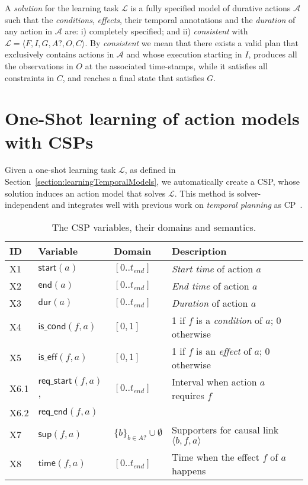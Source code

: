\documentclass{ecai}
\newcommand{\tup}[1]{{\langle #1 \rangle}}
\newcommand{\dur}{\mathsf{dur}}    %
\newcommand{\iscond}{\mathsf{is\_cond}}    %
\newcommand{\iseff}{\mathsf{is\_eff}}    %
\newcommand{\start}{\mathsf{start}}%
\newcommand{\en}{\mathsf{end}}     %
\newcommand{\supp}{\mathsf{sup}}   %
\newcommand{\tim}{\mathsf{time}}   %
\newcommand{\reqs}{\mathsf{req\_{start}}} %
\newcommand{\reqe}{\mathsf{req\_{end}}}   %
\begin{document}
A {\em solution} for the learning task $\mathcal{L}$ is a fully specified model of durative actions $\mathcal{A}$ such that the {\em conditions}, {\em effects}, their temporal annotations and the {\em duration} of any action in $\mathcal{A}$ are: i) completely specified; and ii) {\em consistent} with $\mathcal{L}=\tup{F,I,G,A?,O,C}$. By {\em consistent} we mean that there exists a valid plan that exclusively contains actions in $\mathcal{A}$ and whose execution starting in $I$, produces all the observations in $O$ at the associated time-stamps, while it satisfies all constraints in $C$, and reaches a final state that satisfies $G$.



\section{One-Shot learning of action models with CSPs}
\label{section:learningAsCSP}
Given a one-shot learning task $\mathcal{L}$, as defined in Section~\ref{section:learningTemporalModels}, we automatically create a CSP, whose solution induces an action model that solves $\mathcal{L}$. This method is solver-independent and integrates well with previous work on {\em temporal planning} as CP~\cite{garrido2009constraint,vidal2006branching}. 

\begin{table}
\begin{center}
\caption{The CSP variables, their domains and semantics.}
\begin{scriptsize}
\begin{tabular}{llll}
\hline	
{\bf ID} & {\bf Variable} & {\bf Domain} & {\bf Description} \\
\hline
X1 &$\start(a)$ & $[0..t_{end}]$ & {\em Start time} of action $a$ \\
X2 &$\en(a)$ & $[0..t_{end}]$ & {\em End time} of action $a$ \\
X3 &$\dur(a)$ & $[0..t_{end}]$ & {\em Duration} of action $a$ \\

X4 &$\iscond(f,a)$ & $[0,1]$ & 1 if $f$ is a {\em condition} of $a$; 0 otherwise \\
X5 &$\iseff(f,a)$ & $[0,1]$ & 1 if $f$ is an {\em effect} of $a$; 0 otherwise \\

X6.1 &$\reqs(f,a)$, & $[0..t_{end}]$ & Interval when action $a$ requires $f$\\ 
X6.2 &$\reqe(f,a)$  &  & \\

X7 &$\supp(f,a)$ & $\{b\}_{b\in A?} \cup \emptyset $&  Supporters for causal link $\tup{b,f,a}$ \\ 
X8 &$\tim(f,a)$ & $[0..t_{end}]$ & Time when the effect $f$ of $a$ happens\\

\end{tabular}
\end{scriptsize}
\label{table:variables}
\end{center}
\end{table}
\end{document}

